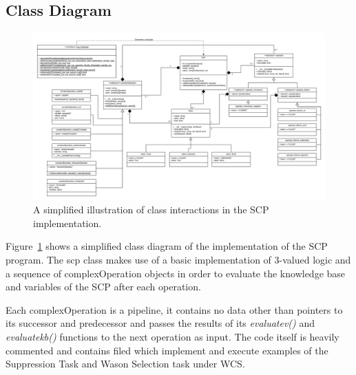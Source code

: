 \documentclass{article}
\begin{document}
\subsection{Class Diagram}

\begin{figure}
    \centering \includegraphics[width=\textwidth]{scpClassDiagram}
    \caption{A simplified illustration of class interactions in the SCP implementation.}
    \label{fig:classDiagram}
\end{figure}

Figure~\ref{fig:classDiagram} shows a simplified class diagram of the implementation of the SCP program. The scp class makes use of a basic implementation of 3-valued logic and a sequence of complexOperation objects in order to evaluate the knowledge base and variables of the SCP after each operation.

Each complexOperation is a pipeline, it contains no data other than pointers to its successor and predecessor and passes the results of its \textit{evaluatev()} and \textit{evaluatekb()} functions to the next operation as input. The code itself is heavily commented and contains filed which implement and execute examples of the Suppression Task and Wason Selection task under WCS.
\end{document}
